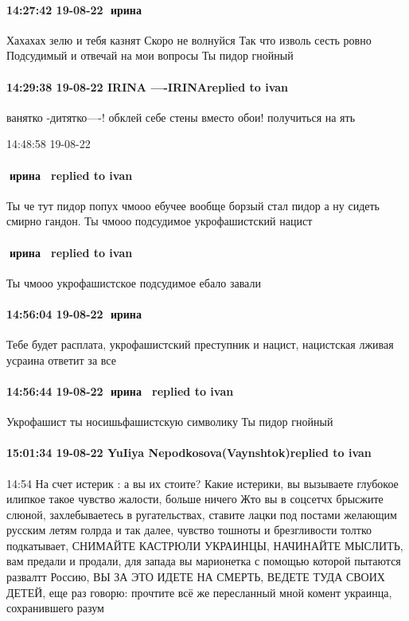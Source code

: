 \paragraph{14:27:42 19-08-22 🍏ирина 🍇🍇}

Хахахах зелю и тебя казнят
Скоро не волнуйся
Так что изволь сесть ровно
Подсудимый и отвечай на мои вопросы
Ты пидор гнойный

\paragraph{14:29:38 19-08-22 IRINA ----IRINAreplied to ivan}

ванятко -дитятко----! обклей себе стены вместо обои! получиться на ять

14:48:58 19-08-22
\paragraph{🍏ирина 🍇🍇replied to ivan}

Ты че тут пидор попух чмооо ебучее вообще борзый стал пидор а ну сидеть смирно гандон.
Ты чмооо подсудимое укрофашистский нацист

\paragraph{🍏ирина 🍇🍇replied to ivan}
Ты чмооо укрофашистское подсудимое ебало завали

\paragraph{14:56:04 19-08-22 🍏ирина 🍇🍇}

Тебе будет расплата, укрофашистский преступник и нацист, нацистская лживая
усраина ответит за все

\paragraph{14:56:44 19-08-22 🍏ирина 🍇🍇replied to ivan}

Укрофашист ты носишьфашистскую символику
Ты пидор гнойный

\paragraph{15:01:34 19-08-22 YuIiya Nepodkosova(Vaynshtok)replied to ivan}
14:54
На счет истерик : а вы их стоите? Какие истерики, вы вызываете глубокое илипкое
такое чувство жалости, больше ничего Жто вы в соцсетчх брысжите слюной,
захлебываетесь в ругательствах, ставите лацки под постами желающим русским
летям голрда и так далее, чувство тошноты и брезгливости толтко подкатывает,
СНИМАЙТЕ КАСТРЮЛИ УКРАИНЦЫ, НАЧИНАЙТЕ МЫСЛИТЬ, вам предали и продали, для
запада вы марионетка с помощью которой пытаются развалтт Россию, ВЫ ЗА ЭТО
ИДЕТЕ НА СМЕРТЬ, ВЕДЕТЕ ТУДА СВОИХ ДЕТЕЙ, еще раз говорю: прочтите всё же
пересланный мной комент украинца, сохранившего разум
